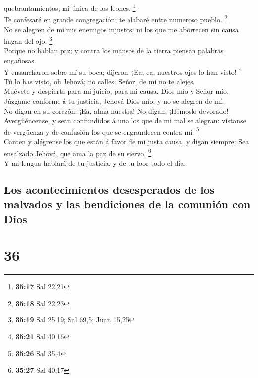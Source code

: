 quebrantamientos, mi única de los leones. \footnote{\textbf{35:17} Sal
  22,21}\\
 Te confesaré en grande congregación; te alabaré entre
numeroso pueblo. \footnote{\textbf{35:18} Sal 22,23}\\
 No se alegren de mí mis enemigos injustos: ni los que me
aborrecen sin causa hagan del ojo. \footnote{\textbf{35:19} Sal 25,19;
  Sal 69,5; Juan 15,25}\\
 Porque no hablan paz; y contra los mansos de la tierra
piensan palabras engañosas.\\
 Y ensancharon sobre mí su boca; dijeron: ¡Ea, ea, nuestros
ojos lo han visto! \footnote{\textbf{35:21} Sal 40,16}\\
 Tú lo has visto, oh Jehová; no calles: Señor, de mí no te
alejes.\\
 Muévete y despierta para mi juicio, para mi causa, Dios
mío y Señor mío.\\
 Júzgame conforme á tu justicia, Jehová Dios mío; y no se
alegren de mí.\\
 No digan en su corazón: ¡Ea, alma nuestra! No digan:
¡Hémoslo devorado!\\
 Avergüéncense, y sean confundidos á una los que de mi mal
se alegran: vístanse de vergüenza y de confusión los que se engrandecen
contra mí. \footnote{\textbf{35:26} Sal 35,4}\\
 Canten y alégrense los que están á favor de mi justa
causa, y digan siempre: Sea ensalzado Jehová, que ama la paz de su
siervo. \footnote{\textbf{35:27} Sal 40,17}\\
 Y mi lengua hablará de tu justicia, y de tu loor todo el
día.

\hypertarget{los-acontecimientos-desesperados-de-los-malvados-y-las-bendiciones-de-la-comuniuxf3n-con-dios}{%
\subsection{Los acontecimientos desesperados de los malvados y las
bendiciones de la comunión con
Dios}\label{los-acontecimientos-desesperados-de-los-malvados-y-las-bendiciones-de-la-comuniuxf3n-con-dios}}

\hypertarget{section-35}{%
\section{36}\label{section-35}}


